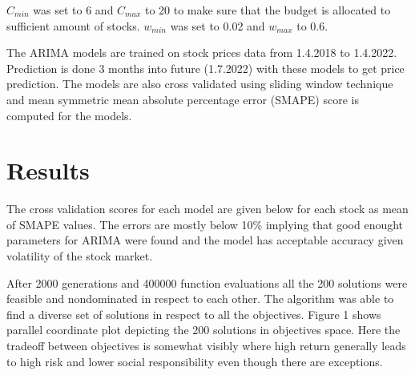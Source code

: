 \documentclass[11pt]{article} %
\begin{document}
$C_{min}$ was set to 6 and $C_{max}$ to 20 to make sure that the budget is allocated to sufficient amount of stocks. $w_{min}$ was set to 0.02 and $w_{max}$ to 0.6. 

The ARIMA models are trained on stock prices data from 1.4.2018 to 1.4.2022. Prediction is done 3 months into future (1.7.2022) with these models to get price prediction. The models are also cross validated using sliding window technique and mean symmetric mean absolute percentage error (SMAPE) score is computed for the models.

\section{Results}

The cross validation scores for each model are given below for each stock as mean of SMAPE values. The errors are mostly below 10\% implying that good enought parameters for ARIMA were found and the model has acceptable accuracy given volatility of the stock market.

After 2000 generations and 400000 function evaluations all the 200 solutions were feasible and nondominated in respect to each other. The algorithm was able to find a diverse set of solutions in respect to all the objectives. Figure 1 shows parallel coordinate plot depicting the 200 solutions in objectives space. Here the tradeoff between objectives is somewhat visibly where high return generally leads to high risk and lower social responsibility even though there are exceptions.
\end{document}

